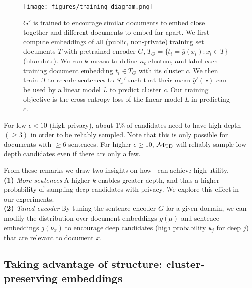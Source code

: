 \begin{figure}
	\centering
	\texttt{[image: figures/training\_diagram.png]} 
	\vspace{-0.65cm}
	\caption{$G'$ is trained to encourage similar documents to embed close together and different documents to embed far apart. We first compute embeddings of all (public, non-private) training set documents $T$ with pretrained encoder $G$, $T_G = \{t_i = \overline{g}(x_i) : x_i \in T\}$ (blue dots). We run $k$-means to define $n_c$ clusters, and label each training document embedding $t_i \in T_G$ with its cluster $c$. We then train $H$ to recode sentences to $S_x'$ such that their mean $\overline{g}'(x)$ can be used by a linear model $L$ to predict cluster $c$. Our training objective is the cross-entropy loss of the linear model $L$ in predicting $c$.}
	\label{fig:training diagram}
	\vspace{-0.4cm}
\end{figure}

For low $\epsilon < 10$ (high privacy), about 1\% of candidates need to have high depth $(\geq 3)$ in order to be reliably sampled. Note that this is only possible for documents with $\geq 6$ sentences. For higher $\epsilon \geq 10$, $\mathcal{M}_{\text{TD}}$ will reliably sample low depth candidates even if there are only a few. 
 
From these remarks we draw two insights on how \technique\ can achieve high utility.\\
\textbf{(1)} \emph{More sentences} A higher $k$ enables greater depth, and thus a higher probability of sampling deep candidates with privacy. We explore this effect in our experiments. \\
\textbf{(2)} \emph{ Tuned encoder} By tuning the sentence encoder $G$ for a given domain, we can modify the distribution over document embeddings $\overline{g}(\mu)$ and sentence embeddings $g(\nu_x)$ to encourage deep candidates (high probability $u_j$ for deep $j$) that are relevant to document $x$.



\subsection{Taking advantage of structure: cluster-preserving embeddings}

